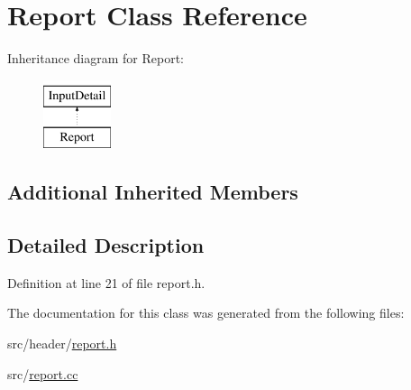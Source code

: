 \hypertarget{classReport}{\section{Report Class Reference}
\label{classReport}
}
Inheritance diagram for Report\-:\begin{figure}[H]
\begin{center}
\leavevmode
\includegraphics[height=2.000000cm]{classReport}
\end{center}
\end{figure}
\subsection*{Additional Inherited Members}


\subsection{Detailed Description}


Definition at line 21 of file report.\-h.



The documentation for this class was generated from the following files\-:\begin{DoxyCompactItemize}
\item 
src/header/\hyperlink{report_8h}{report.\-h}\item 
src/\hyperlink{report_8cc}{report.\-cc}\end{DoxyCompactItemize}
